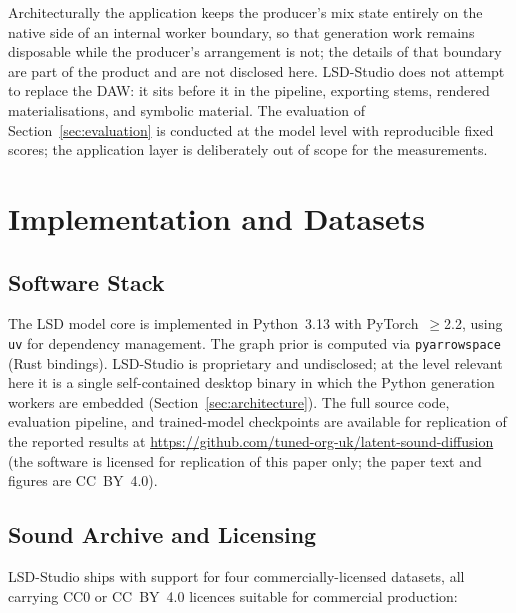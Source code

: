 \documentclass[12pt,a4paper]{article}
\begin{document}
Architecturally the application keeps the producer's mix state entirely
on the native side of an internal worker boundary, so that generation
work remains disposable while the producer's arrangement is not; the
details of that boundary are part of the product and are not disclosed
here. LSD-Studio does not attempt to replace the DAW: it sits before it
in the pipeline, exporting stems, rendered materialisations, and
symbolic material. The evaluation of Section~\ref{sec:evaluation} is
conducted at the model level with reproducible fixed scores; the
application layer is deliberately out of scope for the measurements.


\section{Implementation and Datasets}
\label{sec:implementation}

\subsection{Software Stack}
\label{subsec:impl_stack}

The LSD model core is implemented in Python~3.13 with PyTorch~$\geq$2.2,
using \texttt{uv} for dependency management. The graph prior is computed
via \texttt{pyarrowspace} (Rust bindings). LSD-Studio is proprietary
and undisclosed; at the level relevant here it is a single
self-contained desktop binary in which the Python generation workers
are embedded (Section~\ref{sec:architecture}). The full source code,
evaluation pipeline, and trained-model checkpoints are available for
replication of the reported results at
\url{https://github.com/tuned-org-uk/latent-sound-diffusion} (the
software is licensed for replication of this paper only; the paper text
and figures are CC~BY~4.0).

\subsection{Sound Archive and Licensing}
\label{subsec:impl_datasets}

LSD-Studio ships with support for four commercially-licensed datasets,
all carrying CC0 or CC~BY~4.0 licences suitable for commercial
production:
\end{document}
